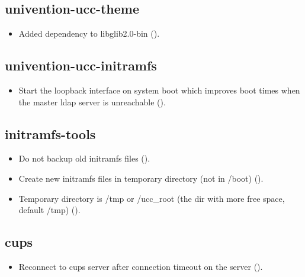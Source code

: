\subsection{univention-ucc-theme}
\begin{itemize}
\item Added dependency to libglib2.0-bin ().
\end{itemize}

\subsection{univention-ucc-initramfs}
\begin{itemize}
\item Start the loopback interface on system boot which improves boot times when the master ldap server is unreachable ().
\end{itemize}

\subsection{initramfs-tools}
\begin{itemize}
\item Do not backup old initramfs files ().
\item Create new initramfs files in temporary directory (not in /boot) ().
\item Temporary directory is /tmp or /ucc\_root (the dir with more free space, default /tmp) ().
\end{itemize}

\subsection{cups}
\begin{itemize}
\item Reconnect to cups server after connection timeout on the server ().
\end{itemize}



